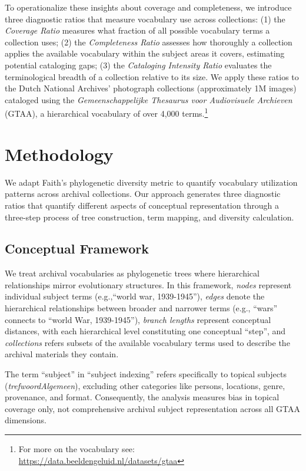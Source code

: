 \documentclass[final]{anthology-ch}
\begin{document}
To operationalize these insights about coverage and completeness, we introduce three diagnostic ratios that measure vocabulary use across collections: 
(1) the \textit{Coverage Ratio} measures what fraction of all possible vocabulary terms a collection uses; (2) the \textit{Completeness Ratio} assesses how thoroughly a collection applies the available vocabulary within the subject areas it covers, estimating potential cataloging gaps; (3) the \textit{Cataloging Intensity Ratio} evaluates the terminological breadth of a collection relative to its size.
%
We apply these ratios to the Dutch National Archives' photograph collections (approximately 1M images) cataloged using the \textit{Gemeenschappelijke Thesaurus voor Audiovisuele Archieven} (GTAA), a hierarchical vocabulary of over 4,000 terms.\footnote{For more on the vocabulary see: \url{https://data.beeldengeluid.nl/datasets/gtaa}} 

\section{Methodology}

We adapt Faith's phylogenetic diversity metric to quantify vocabulary utilization patterns across archival collections. Our approach generates three diagnostic ratios that quantify different aspects of conceptual representation through a three-step process of tree construction, term mapping, and diversity calculation.

\subsection{Conceptual Framework}

We treat archival vocabularies as phylogenetic trees where hierarchical relationships mirror evolutionary structures. In this framework, \textit{nodes} represent individual subject terms (e.g.,``world war, 1939-1945''), \textit{edges} denote the hierarchical relationships between broader and narrower terms (e.g., ``wars'' connects to ``world War, 1939-1945''), \textit{branch lengths} represent conceptual distances, with each hierarchical level constituting one conceptual ``step'', and \textit{collections} refers subsets of the available vocabulary terms used to describe the archival materials they contain.

The term ``subject'' in ``subject indexing'' refers specifically to topical subjects (\textit{trefwoordAlgemeen}), excluding other categories like persons, locations, genre, provenance, and format. Consequently, the analysis measures bias in topical coverage only, not comprehensive archival subject representation across all GTAA dimensions.
\end{document}
